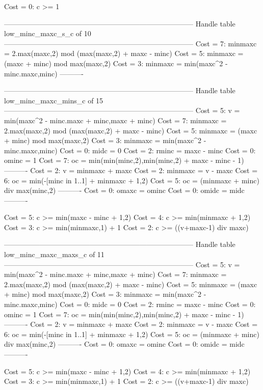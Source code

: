Cost =  0:  c >= 1

--------------------------------------------------------------------------------
Handle table low_minc_maxc_s_c of 10
--------------------------------------------------------------------------------
Cost =  7:  minmaxc = 2.max(maxc,2) mod (max(maxc,2) + maxc - minc)
Cost =  5:  minmaxc = (maxc + minc) mod max(maxc,2)
Cost =  3:  minmaxc = min(maxc^2 - minc.maxc,minc)
----------


--------------------------------------------------------------------------------
Handle table low_minc_maxc_mins_c of 15
--------------------------------------------------------------------------------
Cost =  5:  v       = min(maxc^2 - minc.maxc + minc,maxc + minc)
Cost =  7:  minmaxc = 2.max(maxc,2) mod (max(maxc,2) + maxc - minc)
Cost =  5:  minmaxc = (maxc + minc) mod max(maxc,2)
Cost =  3:  minmaxc = min(maxc^2 - minc.maxc,minc)
Cost =  0:  midc    = 0
Cost =  2:  rminc   = maxc - minc
Cost =  0:  ominc   = 1
Cost =  7:  oc      = min(min(minc,2),min(minc,2) + maxc - minc - 1)
----------
Cost =  2:  v       = minmaxc + maxc
Cost =  2:  minmaxc = v - maxc
Cost =  6:  oc      = min(-[minc in 1..1] + minmaxc + 1,2)
Cost =  5:  oc      = (minmaxc + minc) div max(minc,2)
----------
Cost =  0:  omaxc   = ominc
Cost =  0:  omidc   = midc
----------

Cost =  5:  c >= min(maxc - minc + 1,2)
Cost =  4:  c >= min(minmaxc + 1,2)
Cost =  3:  c >= min(minmaxc,1) + 1
Cost =  2:  c >= ((v+maxc-1) div maxc)

--------------------------------------------------------------------------------
Handle table low_minc_maxc_maxs_c of 11
--------------------------------------------------------------------------------
Cost =  5:  v       = min(maxc^2 - minc.maxc + minc,maxc + minc)
Cost =  7:  minmaxc = 2.max(maxc,2) mod (max(maxc,2) + maxc - minc)
Cost =  5:  minmaxc = (maxc + minc) mod max(maxc,2)
Cost =  3:  minmaxc = min(maxc^2 - minc.maxc,minc)
Cost =  0:  midc    = 0
Cost =  2:  rminc   = maxc - minc
Cost =  0:  ominc   = 1
Cost =  7:  oc      = min(min(minc,2),min(minc,2) + maxc - minc - 1)
----------
Cost =  2:  v       = minmaxc + maxc
Cost =  2:  minmaxc = v - maxc
Cost =  6:  oc      = min(-[minc in 1..1] + minmaxc + 1,2)
Cost =  5:  oc      = (minmaxc + minc) div max(minc,2)
----------
Cost =  0:  omaxc   = ominc
Cost =  0:  omidc   = midc
----------

Cost =  5:  c >= min(maxc - minc + 1,2)
Cost =  4:  c >= min(minmaxc + 1,2)
Cost =  3:  c >= min(minmaxc,1) + 1
Cost =  2:  c >= ((v+maxc-1) div maxc)

